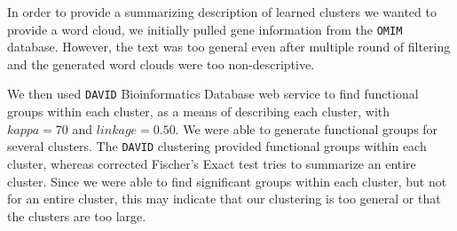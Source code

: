 \documentclass[aps,prd,final,onecolumn,a4paper,10pt]{revtex4}
\begin{document}
In order to provide a summarizing description of learned clusters we wanted to provide a word cloud, we initially pulled gene information from the \verb!OMIM! database. However, the text was too general even after multiple round of filtering and the generated word clouds were too non-descriptive.

We then used \verb!DAVID! Bioinformatics Database web service to find functional groups within each cluster, as a means of describing each cluster, with $kappa=70$ and $linkage = 0.50$. We were able to generate functional groups for several clusters.
The \verb!DAVID! clustering provided functional groups within each cluster, whereas corrected Fischer's Exact test tries to summarize an entire cluster. Since we were able to find significant groups within each cluster, but not for an entire cluster, this may indicate that our clustering is too general or that the clusters are too large.

\begin{figure}[h]

\end{figure}
\end{document}
